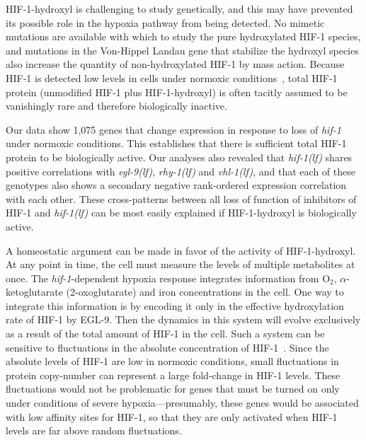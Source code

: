 \documentclass[10pt, onecolumn]{article}
\newcommand{\gene}[1]{\emph{#1}}
\newcommand{\egl}{\emph{\mbox{egl-9}(lf)}}
\newcommand{\rhy}{\emph{\mbox{rhy-1}(lf)}}
\newcommand{\vhl}{\emph{\mbox{vhl-1}(lf)}}
\newcommand{\hif}{\emph{\mbox{hif-1(lf)}}}
\newcommand{\eglp}{EGL-9}
\newcommand{\hifp}{HIF-1}
\newcommand{\hifn}{1,075}
\begin{document}
\hifp{}-hydroxyl is challenging to study genetically, and this may have prevented
its possible role in the hypoxia pathway from being detected. No mimetic
mutations are available with which to study the pure hydroxylated \hifp{} species,
and mutations in the Von-Hippel Landau gene that stabilize the hydroxyl species
also increase the quantity of non-hydroxylated \hifp{} by mass action. Because
\hifp{} is detected low levels in cells under normoxic conditions~\cite{Wang1993},
total \hifp{} protein (unmodified \hifp{} plus \hifp{}-hydroxyl) is often tacitly
assumed to be vanishingly rare and therefore biologically inactive.

%
Our data show \hifn{} genes that change expression in response to loss of
\gene{hif-1} under normoxic conditions. This establishes that there is sufficient
total \hifp{} protein to be biologically active. Our analyses also revealed that
\hif{} shares positive correlations with \egl{}, \rhy{} and \vhl{}, and that each
of these genotypes also shows a secondary negative rank-ordered expression
correlation with each other. These cross-patterns between all loss of function
of inhibitors of \hifp{} and \hif{} can be most easily explained if
\hifp{}-hydroxyl is biologically active.

A homeostatic argument can be made in favor of the activity of \hifp{}-hydroxyl.
At any point in time, the cell must measure the levels of multiple metabolites
at once. The \gene{hif-1}-dependent hypoxia response integrates information from
O$_2$, $\alpha$-ketoglutarate (2-oxoglutarate) and iron concentrations in the
cell. One way to integrate this information is by encoding it only in the
effective hydroxylation rate of \hifp{} by \eglp{}. Then the dynamics in this
system will evolve exclusively as a result of the total amount of \hifp{} in the
cell. Such a system can be sensitive to fluctuations in the absolute
concentration of \hifp{}~\cite{Goentoro2009a}. Since the absolute levels of
\hifp{} are low in normoxic conditions, small fluctuations in protein copy-number
can represent a large fold-change in \hifp{} levels. These fluctuations would
not be problematic for genes that must be turned on only under conditions of
severe hypoxia---presumably, these genes would be associated with low affinity
sites for \hifp{}, so that they are only activated when \hifp{} levels are far
above random fluctuations.
\end{document}
